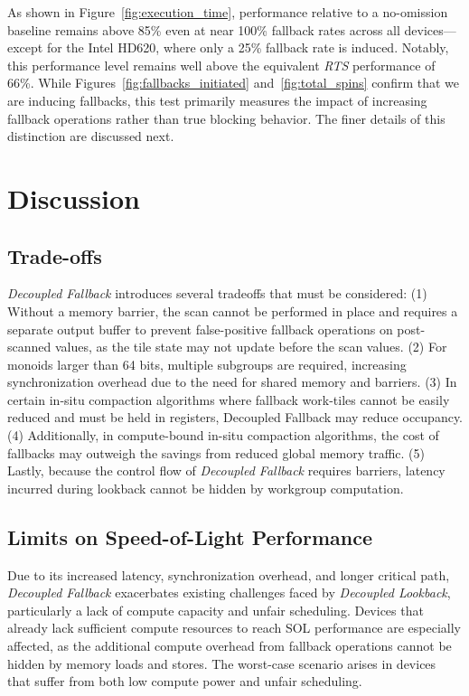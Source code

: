\documentclass[sigconf]{acmart}
\begin{document}
As shown in Figure~\ref{fig:execution_time}, performance relative to a no-omission baseline remains above 85\% even at near 100\% fallback rates across all devices---except for the Intel HD620, where only a 25\% fallback rate is induced. Notably, this performance level remains well above the equivalent \emph{RTS} performance of 66\%. While Figures~\ref{fig:fallbacks_initiated} and~\ref{fig:total_spins} confirm that we are inducing fallbacks, this test primarily measures the impact of increasing fallback operations rather than true blocking behavior. The finer details of this distinction are discussed next.
\section{Discussion}

\subsection{Trade-offs}
\emph{Decoupled Fallback} introduces several tradeoffs that must be considered: (1) Without a memory barrier, the scan cannot be performed in place and requires a separate output buffer to prevent false-positive fallback operations on post-scanned values, as the tile state may not update before the scan values. (2) For monoids larger than 64 bits, multiple subgroups are required, increasing synchronization overhead due to the need for shared memory and barriers. (3) In certain in-situ compaction algorithms where fallback work-tiles cannot be easily reduced and must be held in registers, Decoupled Fallback may reduce occupancy. (4) Additionally, in compute-bound in-situ compaction algorithms, the cost of fallbacks may outweigh the savings from reduced global memory traffic. (5) Lastly, because the control flow of \emph{Decoupled Fallback} requires barriers, latency incurred during lookback cannot be hidden by workgroup computation.

\subsection{Limits on Speed-of-Light Performance}
Due to its increased latency, synchronization overhead, and longer critical path, \emph{Decoupled Fallback} exacerbates existing challenges faced by \emph{Decoupled Lookback}, particularly a lack of compute capacity and unfair scheduling. Devices that already lack sufficient compute resources to reach SOL performance are especially affected, as the additional compute overhead from fallback operations cannot be hidden by memory loads and stores. The worst-case scenario arises in devices that suffer from both low compute power and unfair scheduling.
\end{document}
